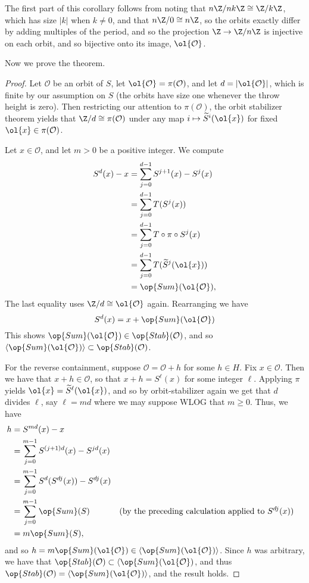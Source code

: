 \documentclass[12nt]{article}
\theoremstyle{plain}
\begin{document}
The first part of this corollary follows from noting that $n\Z/nk\Z \cong \Z/k\Z$, which has size $|k|$ when $k \neq 0$, and that $n\Z/0 \cong n\Z$, so the orbits exactly differ by adding multiples of the period, and so the projection $\Z \to \Z/n\Z$ is injective on each orbit, and so bijective onto its image, $\ol{\mathcal{O}}$. 

Now we prove the theorem.

\begin{proof}
Let $\mathcal{O}$ be an orbit of $S$, let $\ol{\mathcal{O}} = \pi(\mathcal{O})$, and let $d = |\ol{\mathcal{O}}|$, which is finite by our assumption on $S$ (the orbits have size one whenever the throw height is zero). Then restricting our attention to $\pi(\mathcal{O})$, the orbit stabilizer theorem yields that $\Z/d \cong \pi(\mathcal{O})$ under any map $i \mapsto \widetilde{S}^i(\ol{x})$ for fixed $\ol{x} \in \pi(\mathcal{O})$. 

Let $x \in \mathcal{O}$, and let $m > 0$ be a positive integer. We compute
\begin{align*}
S^{d}(x) - x &= \sum \limits_{j = 0}^{d - 1} S^{j+1}(x) - S^j(x) \\
	&= \sum \limits_{j = 0}^{d - 1} T(S^j(x)) \\
	&= \sum \limits_{j = 0}^{d - 1} T \circ \pi \circ S^j(x) \\
	&= \sum \limits_{j = 0}^{d - 1} T(\widetilde{S}^j(\ol{x})) \\
	&= \op{Sum}(\ol{\mathcal{O}}),
\end{align*}
The last equality uses $\Z/d \cong \ol{\mathcal{O}}$ again. Rearranging we have 
\[
S^{d}(x) = x + \op{Sum}(\ol{\mathcal{O}})
\]
This shows $\op{Sum}(\ol{\mathcal{O}}) \in \op{Stab}(\mathcal{O})$, and so $\langle \op{Sum}(\ol{\mathcal{O}}) \rangle \subset \op{Stab}(\mathcal{O})$.  

For the reverse containment, suppose $\mathcal{O} = \mathcal{O} + h$ for some $h \in H$. Fix $x \in \mathcal{O}$. Then we have that $x + h \in \mathcal{O}$, so that $x + h = S^{\ell}(x)$ for some integer $\ell$. Applying $\pi$ yields $\ol{x} = \widetilde{S}^{\ell}(\ol{x})$, and so by orbit-stabilizer again we get that $d$ divides $\ell$, say $\ell = md$ where we may suppose WLOG that $m \geq 0$. Thus, we have
\begin{align*}
h &= S^{md}(x) - x \\
	&= \sum \limits_{j=0}^{m - 1} S^{(j+1)d}(x) - S^{jd}(x) \\
	&= \sum \limits_{j=0}^{m-1} S^d(S^{dj}(x)) - S^{dj}(x) \\
	&= \sum \limits_{j=0}^{m-1} \op{Sum}(S) && \text{(by the preceding calculation applied to $S^{dj}(x))$} \\
	&= m \op{Sum}(S),
\end{align*}
and so $h = m\op{Sum}(\ol{\mathcal{O}}) \in \langle \op{Sum}(\ol{\mathcal{O}}) \rangle$. Since $h$ was arbitrary, we have that $\op{Stab}(\mathcal{O}) \subset \langle \op{Sum}(\ol{\mathcal{O}})$, and thus $\op{Stab}(\mathcal{O}) = \langle \op{Sum}(\ol{\mathcal{O}})\rangle$, and the result holds. 

\end{proof}
\end{document}
